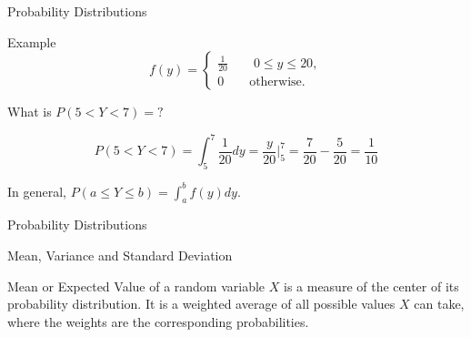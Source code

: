 \documentclass{beamer}\usepackage[]{graphicx}\usepackage[]{color}
\begin{document}
\begin{darkframes}
\begin{frame}[label=lists]{Probability Distributions}
\begin{exampleblock}{Example}
		$$ f(y) = 
			\begin{cases}
				\frac{1}{20} \qquad 0 \leq y \leq 20, \\
				0 \qquad   \text{otherwise.}
			\end{cases}
		$$  \pause
		
		What is $P(5<Y<7)=?$   \pause
		
		$$
			P(5<Y<7) = \int_5^7 \frac{1}{20} dy = \frac{y}{20} |_5^7 = \frac{7}{20} - \frac{5}{20} =  \frac{1}{10}
		$$  \pause
		
		
		\end{exampleblock}
		
		In general, \alert{$P(a \leq Y \leq b) = \int_a^b f(y)dy$}.
				
	\end{frame}




	\begin{frame}[label=lists]{Probability Distributions}
		\begin{figure} 
			\centering
			\setlength\fboxsep{0pt}
			\setlength\fboxrule{0.5pt}
		\end{figure} 


				
	\end{frame}
	
	
	
	\begin{frame}[label=lists]{Mean, Variance and Standard Deviation}
		
		\begin{definition}
			\alert{Mean} or \alert{Expected Value} of a random variable $X$ is a measure of the center of its probability distribution. It is a weighted average of all possible values $X$ can take, where the weights are the corresponding probabilities. 
		\end{definition} \pause
		

\end{frame}
\end{darkframes}
\end{document}
